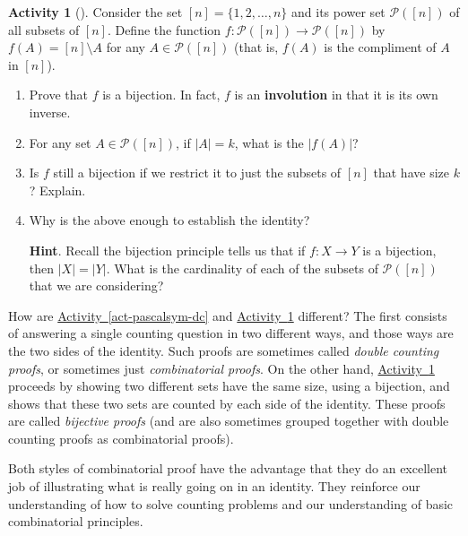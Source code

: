 \documentclass[10pt,]{book}
\newcommand{\terminology}[1]{\textbf{#1}}
\theoremstyle{plain}
\theoremstyle{definition}
\theoremstyle{definition}
\theoremstyle{definition}
\newtheorem{activity}[project]{Activity}
\theoremstyle{definition}
\numberwithin{equation}{chapter}
\def\pow{\mathcal P}
\newcommand{\card}[1]{\left| #1 \right|}
\begin{document}
\begin{activity}[]\label{act-pascalsym-bij}
\hypertarget{p-470}{}%
Consider the set \([n] = \{1,2,\ldots,n\}\) and its power set \(\pow([n])\) of all subsets of \([n]\).  Define the function \(f:\pow([n]) \to \pow([n])\) by \(f(A) = [n]\setminus A\) for any \(A \in \pow([n])\) (that is, \(f(A)\) is the compliment of \(A\) in \([n]\)).%
\begin{enumerate}[font=\bfseries,label=(\alph*),ref=\alph*]
\item\label{task-36} \hypertarget{p-471}{}%
Prove that \(f\) is a bijection.  In fact, \(f\) is an \terminology{involution} in that it is its own inverse.%
\item\label{task-37} \hypertarget{p-472}{}%
For any set \(A \in \pow([n])\), if \(\card{A} = k\), what is the \(\card{f(A)}\)?%
\item\label{task-38} \hypertarget{p-473}{}%
Is \(f\) still a bijection if we restrict it to just the subsets of \([n]\) that have size \(k\)?  Explain.%
\item\label{task-39} \hypertarget{p-474}{}%
Why is the above enough to establish the identity?%
\par\smallskip%
\noindent\textbf{Hint}.\hypertarget{hint-8}{}\quad%
\hypertarget{p-475}{}%
Recall the bijection principle tells us that if \(f:X \to Y\) is a bijection, then \(\card{X} = \card{Y}\).  What is the cardinality of each of the subsets of \(\pow([n])\) that we are considering?%
\end{enumerate}
\end{activity}
\hypertarget{p-476}{}%
How are \hyperref[act-pascalsym-dc]{Activity~\ref{act-pascalsym-dc}} and \hyperref[act-pascalsym-bij]{Activity~\ref{act-pascalsym-bij}} different?  The first consists of answering a single counting question in two different ways, and those ways are the two sides of the identity.  Such proofs are sometimes called \emph{double counting proofs}, or sometimes just \emph{combinatorial proofs}.  On the other hand, \hyperref[act-pascalsym-bij]{Activity~\ref{act-pascalsym-bij}} proceeds by showing two different sets have the same size, using a bijection, and shows that these two sets are counted by each side of the identity.  These proofs are called \emph{bijective proofs} (and are also sometimes grouped together with double counting proofs as combinatorial proofs).%
\par
\hypertarget{p-477}{}%
Both styles of combinatorial proof have the advantage that they do an excellent job of illustrating what is really going on in an identity.  They reinforce our understanding of how to solve counting problems and our understanding of basic combinatorial principles.%
\end{document}
